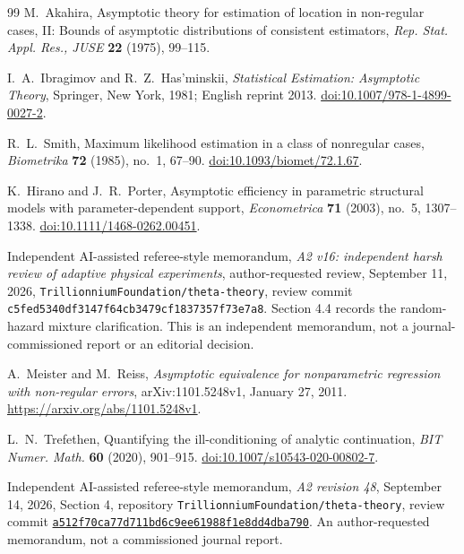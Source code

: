 \begin{thebibliography}{99}
M.~Akahira, Asymptotic theory for estimation of location in non-regular
cases, II: Bounds of asymptotic distributions of consistent estimators,
\emph{Rep. Stat. Appl. Res., JUSE} \textbf{22} (1975), 99--115.

I.~A.~Ibragimov and R.~Z.~Has'minskii,
\emph{Statistical Estimation: Asymptotic Theory},
Springer, New York, 1981; English reprint 2013.
\href{https://doi.org/10.1007/978-1-4899-0027-2}{doi:10.1007/978-1-4899-0027-2}.

R.~L.~Smith, Maximum likelihood estimation in a class of nonregular
cases, \emph{Biometrika} \textbf{72} (1985), no.~1, 67--90.
\href{https://doi.org/10.1093/biomet/72.1.67}{doi:10.1093/biomet/72.1.67}.

K.~Hirano and J.~R.~Porter,
Asymptotic efficiency in parametric structural models with
parameter-dependent support, \emph{Econometrica} \textbf{71} (2003),
no.~5, 1307--1338.
\href{https://doi.org/10.1111/1468-0262.00451}{doi:10.1111/1468-0262.00451}.

Independent AI-assisted referee-style memorandum,
\emph{A2 v16: independent harsh review of adaptive physical experiments},
author-requested review, September 11, 2026,
\texttt{Trillionnium\allowbreak Foundation/\allowbreak theta-theory},
review commit \texttt{c5fed534\allowbreak 0df3147f\allowbreak 64cb3479\allowbreak cf183735\allowbreak 7f73e7a8}.
Section 4.4 records the random-hazard mixture clarification.
This is an independent memorandum, not a journal-commissioned report
or an editorial decision.

A.~Meister and M.~Reiss, \emph{Asymptotic equivalence for nonparametric
regression with non-regular errors}, arXiv:1101.5248v1, January 27, 2011.
\url{https://arxiv.org/abs/1101.5248v1}.

L.~N.~Trefethen, Quantifying the ill-conditioning of analytic continuation,
\emph{BIT Numer. Math.} \textbf{60} (2020), 901--915.
\href{https://doi.org/10.1007/s10543-020-00802-7}{doi:10.1007/s10543-020-00802-7}.


Independent AI-assisted referee-style memorandum,
\emph{A2 revision 48}, September 14, 2026, Section 4,
repository \texttt{Trillionnium\allowbreak Foundation/\allowbreak theta-theory},
review commit
\href{https://github.com/TrillionniumFoundation/theta-theory/commit/a512f70ca77d711bd6c9ee61988f1e8dd4dba790}{\texttt{a512f70c\allowbreak a77d711b\allowbreak d6c9ee61\allowbreak 988f1e8d\allowbreak d4dba790}}.
An author-requested memorandum, not a commissioned journal report.



\end{thebibliography}
